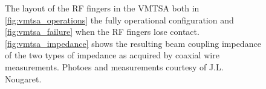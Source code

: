 \begin{figure}


\label{fig:rf_finger_imp}
\caption{The layout of the RF fingers in the VMTSA both in \ref{fig:vmtsa_operations} the fully operational configuration and \ref{fig:vmtsa_failure} when the RF fingers lose contact. \ref{fig:vmtsa_impedance} shows the resulting beam coupling impedance of the two types of impedance as acquired by coaxial wire measurements. Photoes and measurements courtesy of J.L. Nougaret.}
\end{figure}